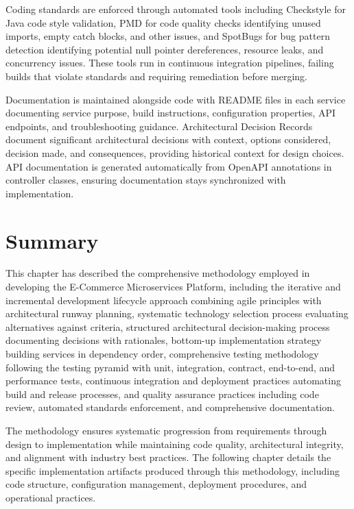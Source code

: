 Coding standards are enforced through automated tools including Checkstyle for Java code style validation, PMD for code quality checks identifying unused imports, empty catch blocks, and other issues, and SpotBugs for bug pattern detection identifying potential null pointer dereferences, resource leaks, and concurrency issues. These tools run in continuous integration pipelines, failing builds that violate standards and requiring remediation before merging.

Documentation is maintained alongside code with README files in each service documenting service purpose, build instructions, configuration properties, API endpoints, and troubleshooting guidance. Architectural Decision Records document significant architectural decisions with context, options considered, decision made, and consequences, providing historical context for design choices. API documentation is generated automatically from OpenAPI annotations in controller classes, ensuring documentation stays synchronized with implementation.

\section{Summary}

This chapter has described the comprehensive methodology employed in developing the E-Commerce Microservices Platform, including the iterative and incremental development lifecycle approach combining agile principles with architectural runway planning, systematic technology selection process evaluating alternatives against criteria, structured architectural decision-making process documenting decisions with rationales, bottom-up implementation strategy building services in dependency order, comprehensive testing methodology following the testing pyramid with unit, integration, contract, end-to-end, and performance tests, continuous integration and deployment practices automating build and release processes, and quality assurance practices including code review, automated standards enforcement, and comprehensive documentation.

The methodology ensures systematic progression from requirements through design to implementation while maintaining code quality, architectural integrity, and alignment with industry best practices. The following chapter details the specific implementation artifacts produced through this methodology, including code structure, configuration management, deployment procedures, and operational practices.
